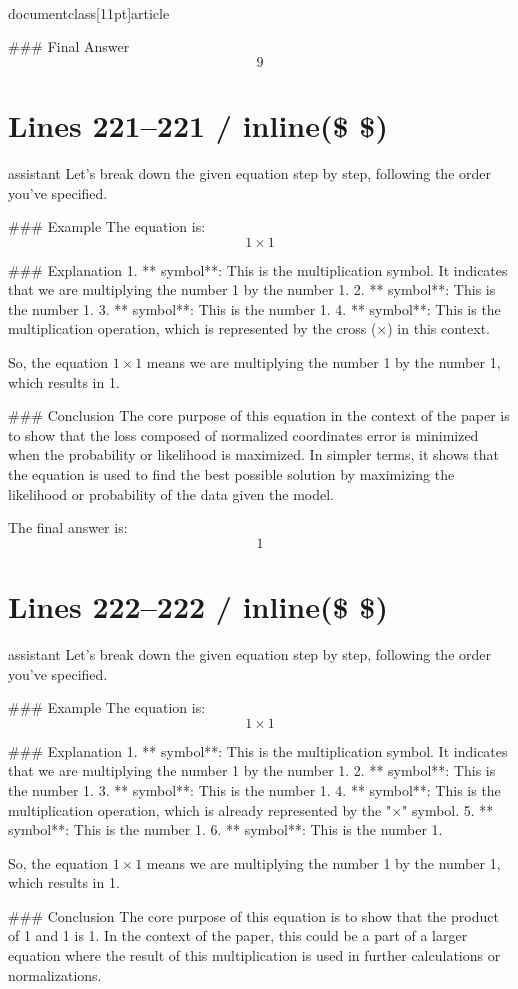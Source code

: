 \\documentclass[11pt]{article}
\begin{document}
### Final Answer
\[
\boxed{9}
\]


\section*{Lines 221–221 / inline(\$ \$) }
assistant
Let's break down the given equation step by step, following the order you've specified.

### Example
The equation is:
\[ 1 \times 1 \]

### Explanation
1. ** symbol**: This is the multiplication symbol. It indicates that we are multiplying the number 1 by the number 1.
2. ** symbol**: This is the number 1.
3. ** symbol**: This is the number 1.
4. ** symbol**: This is the multiplication operation, which is represented by the cross (×) in this context.

So, the equation \(1 \times 1\) means we are multiplying the number 1 by the number 1, which results in 1.

### Conclusion
The core purpose of this equation in the context of the paper is to show that the loss composed of normalized coordinates error is minimized when the probability or likelihood is maximized. In simpler terms, it shows that the equation is used to find the best possible solution by maximizing the likelihood or probability of the data given the model.

The final answer is:
\[
\boxed{1}
\]


\section*{Lines 222–222 / inline(\$ \$) }
assistant
Let's break down the given equation step by step, following the order you've specified.

### Example
The equation is:
\[ 1 \times 1 \]

### Explanation
1. ** symbol**: This is the multiplication symbol. It indicates that we are multiplying the number 1 by the number 1.
2. ** symbol**: This is the number 1.
3. ** symbol**: This is the number 1.
4. ** symbol**: This is the multiplication operation, which is already represented by the "×" symbol.
5. ** symbol**: This is the number 1.
6. ** symbol**: This is the number 1.

So, the equation \( 1 \times 1 \) means we are multiplying the number 1 by the number 1, which results in 1.

### Conclusion
The core purpose of this equation is to show that the product of 1 and 1 is 1. In the context of the paper, this could be a part of a larger equation where the result of this multiplication is used in further calculations or normalizations.
\end{document}
